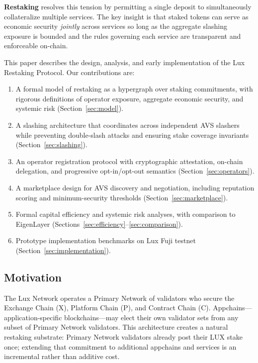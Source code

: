 \documentclass[11pt]{article}
\begin{document}
\textbf{Restaking} resolves this tension by permitting a single deposit to simultaneously
collateralize multiple services. The key insight is that staked tokens can serve as economic
security \emph{jointly} across services so long as the aggregate slashing exposure is bounded
and the rules governing each service are transparent and enforceable on-chain.

This paper describes the design, analysis, and early implementation of the Lux Restaking
Protocol. Our contributions are:

\begin{enumerate}[leftmargin=1.5em]
  \item A formal model of restaking as a hypergraph over staking commitments, with rigorous
    definitions of operator exposure, aggregate economic security, and systemic risk
    (Section~\ref{sec:model}).
  \item A slashing architecture that coordinates across independent AVS slashers while
    preventing double-slash attacks and ensuring stake coverage invariants
    (Section~\ref{sec:slashing}).
  \item An operator registration protocol with cryptographic attestation, on-chain delegation,
    and progressive opt-in/opt-out semantics (Section~\ref{sec:operators}).
  \item A marketplace design for AVS discovery and negotiation, including reputation scoring
    and minimum-security thresholds (Section~\ref{sec:marketplace}).
  \item Formal capital efficiency and systemic risk analyses, with comparison to EigenLayer
    (Sections~\ref{sec:efficiency}--\ref{sec:comparison}).
  \item Prototype implementation benchmarks on Lux Fuji testnet
    (Section~\ref{sec:implementation}).
\end{enumerate}

\subsection{Motivation}

The Lux Network operates a Primary Network of validators who secure the Exchange Chain (X),
Platform Chain (P), and Contract Chain (C). Appchains---application-specific blockchains---may
elect their own validator sets from any subset of Primary Network validators. This architecture
creates a natural restaking substrate: Primary Network validators already post their LUX stake
once; extending that commitment to additional appchains and services is an incremental rather
than additive cost.
\end{document}
